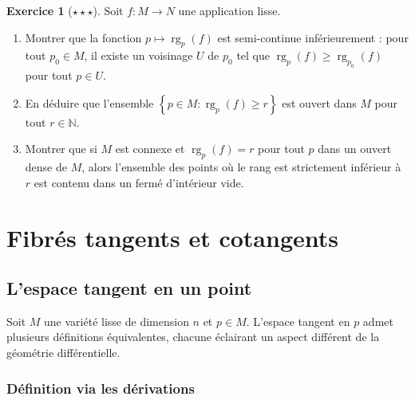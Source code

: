 \documentclass[12pt,a4paper,openany]{book}
\theoremstyle{definition}
\newtheorem{exercice}{Exercice}[chapter]
\theoremstyle{plain}
\theoremstyle{remark}
\newcommand{\N}{\mathbb{N}}
\DeclareMathOperator{\rg}{rg}
\newcommand{\set}[1]{\left\{#1\right\}}
\begin{document}
\begin{exercice}[$\star\star\star$]\label{exo:rang-semi-continu}
Soit $f \colon M \to N$ une application lisse.
\begin{enumerate}[label=(\alph*)]
    \item Montrer que la fonction $p \mapsto \rg_p(f)$ est semi-continue
    inférieurement : pour tout $p_0 \in M$, il existe un voisinage $U$ de
    $p_0$ tel que $\rg_p(f) \geq \rg_{p_0}(f)$ pour tout $p \in U$.
    \item En déduire que l'ensemble $\set{p \in M : \rg_p(f) \geq r}$ est
    ouvert dans $M$ pour tout $r \in \N$.
    \item Montrer que si $M$ est connexe et $\rg_p(f) = r$ pour tout $p$ dans
    un ouvert dense de $M$, alors l'ensemble des points où le rang est
    strictement inférieur à $r$ est contenu dans un fermé d'intérieur vide.
\end{enumerate}
\end{exercice}


\chapter{Fibrés tangents et cotangents}\label{ch:fibres-tangents}
\minitoc\bigskip

\section{L'espace tangent en un point}\label{sec:espace-tangent}

Soit $M$ une variété lisse de dimension $n$ et $p \in M$.
L'espace tangent en $p$ admet plusieurs définitions équivalentes,
chacune éclairant un aspect différent de la géométrie différentielle.

\subsection{Définition via les dérivations}\label{subsec:derivations}
\end{document}
